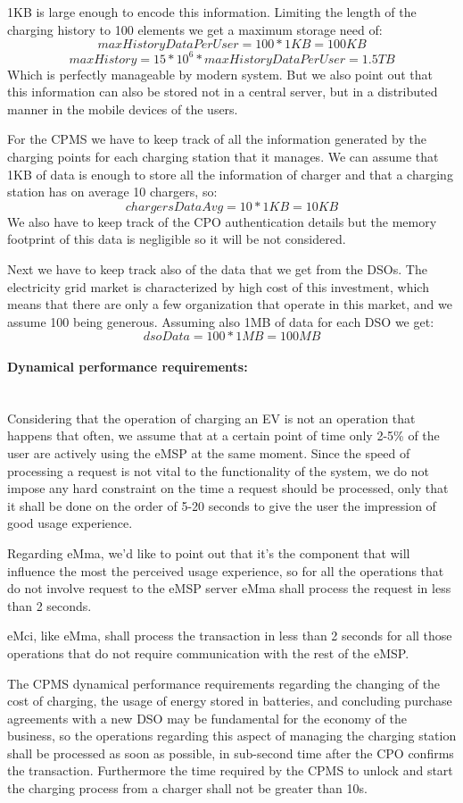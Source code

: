 1KB is large enough to encode this information. Limiting the length of the charging history to 100 elements we get a maximum storage need of:
\[ maxHistoryDataPerUser = 100 * 1KB = 100 KB\]
\[ maxHistory = 15 * 10^6 * maxHistoryDataPerUser = 1.5 TB\]
Which is perfectly manageable by modern system. But we also point out that this information can also be stored not in a central server, but in a distributed manner in the mobile devices of the users.
\par
\medskip
For the CPMS we have to keep track of all the information generated by the charging points for each charging station that it manages. We can assume that 1KB of data is enough to store all the information of charger and that a charging station has on average 10 chargers, so:
\[ chargersDataAvg = 10 * 1KB = 10 KB \]
We also have to keep track of the CPO authentication details but the memory footprint of this data is negligible so it will be not considered.
\par
Next we have to keep track also of the data that we get from the DSOs. The electricity grid market is characterized by high cost of this investment, which means that there are only a few organization that operate in this market, and we assume 100 being generous. Assuming also 1MB of data for each DSO we get:
\[ dsoData = 100 * 1MB = 100 MB \]
\medskip

\paragraph{Dynamical performance requirements:}\mbox{}\\
Considering that the operation of charging an EV is not an operation that happens that often, we assume that at a certain point of time only 2-5\% of the user are actively using the eMSP at the same moment. Since the speed of processing a request is not vital to the functionality of the system, we do not impose any hard constraint on the time a request should be processed, only that it shall be done on the order of 5-20 seconds to give the user the impression of good usage experience.
\medskip
\par
Regarding eMma, we'd like to point out that it's the component that will influence the most the perceived usage experience, so for all the operations that do not involve request to the eMSP server eMma shall process the request in less than 2 seconds.
\medskip
\par
eMci, like eMma, shall process the transaction in less than 2 seconds for all those operations that do not require communication with the rest of the eMSP.
\medskip
\par
The CPMS dynamical performance requirements regarding the changing of the cost of charging, the usage of energy stored in batteries, and concluding purchase agreements with a new DSO may be fundamental for the economy of the business, so the operations regarding this aspect of managing the charging station shall be processed as soon as possible, in sub-second time after the CPO confirms the transaction. Furthermore the time required by the CPMS to unlock and start the charging process from a charger shall not be greater than 10s. 